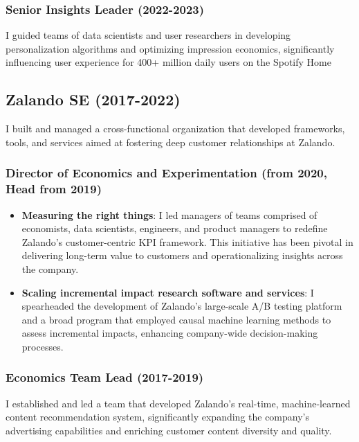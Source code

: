\documentclass[a4paper]{article}
\begin{document}
\subsubsection*{Senior Insights Leader (2022-2023)}

I guided teams of data scientists and user researchers in developing personalization algorithms and optimizing impression economics, significantly influencing user experience for 400+ million daily users on the Spotify Home

\subsection*{Zalando SE (2017-2022)}

I built and managed a cross-functional organization that developed frameworks, tools, and services aimed at fostering deep customer relationships at Zalando.

\subsubsection*{Director of Economics and Experimentation (from 2020, Head from 2019)}

\begin{itemize}
    \item \textbf{Measuring the right things}: I led managers of teams comprised of economists, data scientists, engineers, and product managers to redefine Zalando's customer-centric KPI framework. This initiative has been pivotal in delivering long-term value to customers and operationalizing insights across the company.
    \item \textbf{Scaling incremental impact research software and services}: I spearheaded the development of Zalando's large-scale A/B testing platform and a broad program that employed causal machine learning methods to assess incremental impacts, enhancing company-wide decision-making processes.
\end{itemize}

\subsubsection*{Economics Team Lead (2017-2019)}

I established and led a team that developed Zalando’s real-time, machine-learned content recommendation system, significantly expanding the company’s advertising capabilities and enriching customer content diversity and quality.
\end{document}

